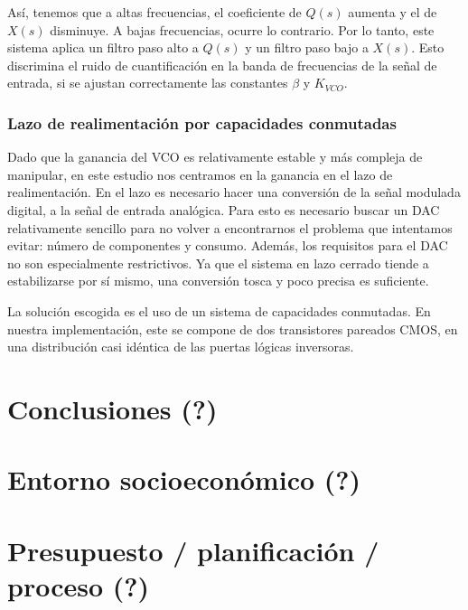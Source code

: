 \documentclass[12pt]{report} %
\begin{document}
	Así, tenemos que a altas frecuencias, el coeficiente de $Q(s)$ aumenta y el de $X(s)$ disminuye. A bajas frecuencias, ocurre lo contrario. Por lo tanto, este sistema aplica un filtro paso alto a $Q(s)$ y un filtro paso bajo a $X(s)$. Esto discrimina el ruido de cuantificación en la banda de frecuencias de la señal de entrada, si se ajustan correctamente las constantes $\beta$ y $K_{VCO}$.
	
	\subsection{Lazo de realimentación por capacidades conmutadas}
	
	Dado que la ganancia del VCO es relativamente estable y más compleja de manipular, en este estudio nos centramos en la ganancia en el lazo de realimentación. En el lazo es necesario hacer una conversión de la señal modulada digital, a la señal de entrada analógica. Para esto es necesario buscar un DAC relativamente sencillo para no volver a encontrarnos el problema que intentamos evitar: número de componentes y consumo. Además, los requisitos para el DAC no son especialmente restrictivos. Ya que el sistema en lazo cerrado tiende a estabilizarse por sí mismo, una conversión tosca %
	y poco precisa es suficiente.
	
	La solución escogida es el uso de un sistema de capacidades conmutadas. En nuestra implementación, este se compone de dos transistores pareados CMOS, en una distribución casi idéntica de las puertas lógicas inversoras.
	
	
	
	
	
	
	

\chapter{Conclusiones (?)}
\chapter{Entorno socioeconómico (?)}
\chapter{Presupuesto / planificación / proceso (?)}


\nocite{*} %
\end{document}
